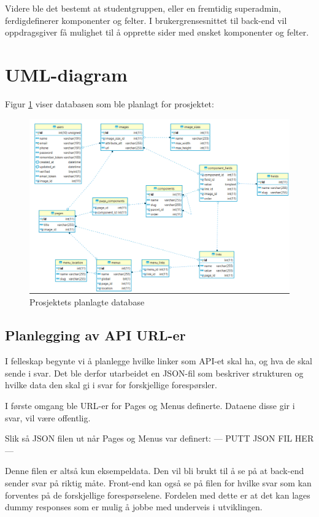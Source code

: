 Videre ble det bestemt at studentgruppen, eller en fremtidig superadmin, ferdigdefinerer komponenter og felter. I brukergrensesnittet til back-end vil oppdragsgiver få mulighet til å opprette sider med ønsket komponenter og felter.  


\section{UML-diagram}
Figur \ref{fig:database} viser databasen som ble planlagt for prosjektet:
\begin{figure}[H]
    \centering
    \includegraphics[width=\textwidth]{planlegging-av-database.png}
    \caption{Prosjektets planlagte database}
    \label{fig:database}
\end{figure}


\subsection{Planlegging av API URL-er}
I felleskap begynte vi å planlegge hvilke linker som API-et skal ha, og hva de skal sende i svar. Det ble derfor utarbeidet en JSON-fil som beskriver strukturen og hvilke data den skal gi i svar for forskjellige forespørsler.

I første omgang ble URL-er for Pages og Menus definerte. Dataene disse gir i svar, vil være offentlig. 

Slik så JSON filen ut når Pages og Menus var definert:
--- PUTT JSON FIL HER ---

Denne filen er altså kun eksempeldata. Den vil bli brukt til å se på at back-end sender svar på riktig måte. Front-end kan også se på filen for hvilke svar som kan forventes på de forskjellige forespørselene. Fordelen med dette er at det kan lages dummy responses som er mulig å jobbe med underveis i utviklingen.

